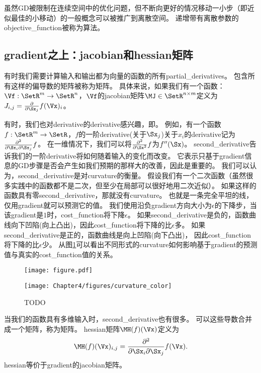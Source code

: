 
虽然\gls{GD}被限制在连续空间中的优化问题，但不断向更好的情况移动一小步（即近似最佳的小移动）的一般概念可以被推广到离散空间。
递增带有离散参数的\gls{objective_function}被称为算法\citep{Russel+Norvig-book2003}。

\subsection{\gls{gradient}之上：\gls{jacobian}和\gls{hessian}矩阵}
\label{sec:beyond_the_gradient_jacobian_and_hessian_matrices}
有时我们需要计算输入和输出都为向量的函数的所有\gls{partial_derivatives}。
包含所有这样的偏导数的矩阵被称为矩阵。
具体来说，如果我们有一个函数：$\Vf: \SetR^m \rightarrow \SetR^n$，$\Vf$的\gls{jacobian}矩阵$\MJ \in \SetR^{n \times m}$定义为$J_{i,j} = \frac{\partial}{\partial \Sx_j} f(\Vx)_i$。

有时，我们也对\gls{derivative}的\gls{derivative}感兴趣，即。
例如，有一个函数$f: \SetR^m \rightarrow \SetR$，$f$的一阶\gls{derivative}(关于$\Sx_j$)关于$x_i$的\gls{derivative}记为$\frac{\partial^2}{\partial \Sx_i \partial \Sx_j} f$。
在一维情况下，我们可以将$\frac{\partial^2}{\partial \Sx^2} f$为$f''(\Sx)$。
\gls{second_derivative}告诉我们的一阶\gls{derivative}将如何随着输入的变化而改变。
它表示只基于\gls{gradient}信息的\gls{GD}步骤是否会产生如我们预期的那样大的改善，因此是重要的。
我们可以认为，\gls{second_derivative}是对\gls{curvature}的衡量。
假设我们有一个二次函数（虽然很多实践中的函数都不是二次，但至少在局部可以很好地用二次近似）。
如果这样的函数具有零\gls{second_derivative}，那就没有\gls{curvature}。
也就是一条完全平坦的线，仅用\gls{gradient}就可以预测它的值。
我们使用沿负\gls{gradient}方向大小为$\epsilon$的下降步，当该\gls{gradient}是$1$时，\gls{cost_function}将下降$\epsilon$。
如果\gls{second_derivative}是负的，函数曲线向下凹陷(向上凸出)，因此\gls{cost_function}将下降的比$\epsilon$多。
如果\gls{second_derivative}是正的，函数曲线是向上凹陷(向下凸出)，
因此\gls{cost_function}将下降的比$\epsilon$少。
从图\ref{fig:chap4_curvature_color}可以看出不同形式的\gls{curvature}如何影响基于\gls{gradient}的预测值与真实的\gls{cost_function}值的关系。
\begin{figure}[!htb]
\ifOpenSource
\centerline{\texttt{[image: figure.pdf]}}
\else
\centerline{\texttt{[image: Chapter4/figures/curvature\_color]}}
\fi
\caption{TODO}
\label{fig:chap4_curvature_color}
\end{figure}

当我们的函数具有多维输入时，\gls{second_derivative}也有很多。
可以这些导数合并成一个矩阵，称为矩阵。
\gls{hessian}矩阵$\MH(f)(\Vx)$定义为
\begin{align}
 \MH(f)(\Vx)_{i,j} = \frac{\partial^2}{\partial \Sx_i \partial  \Sx_j} f(\Vx).
\end{align}
\gls{hessian}等价于\gls{gradient}的\gls{jacobian}矩阵。

